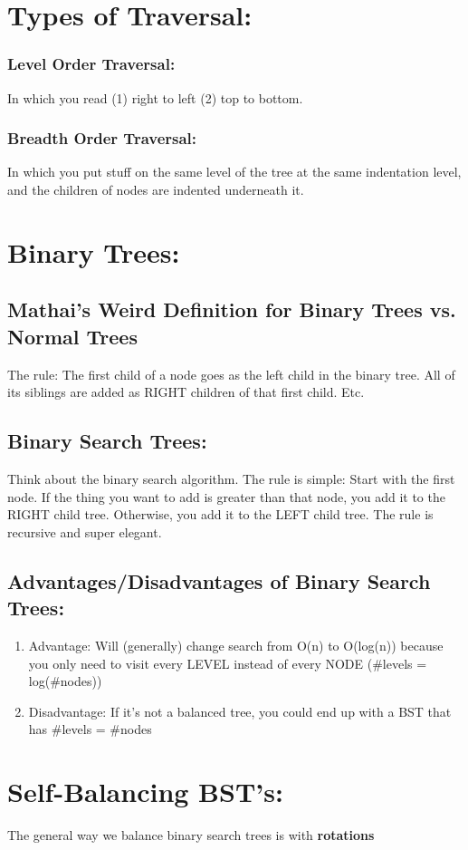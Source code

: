 \documentclass[a4paper,12pt]{report}
\begin{document}
\section{Types of Traversal:}
\subsubsection{Level Order Traversal: }
In which you read (1) right to left (2) top to bottom.
\subsubsection{Breadth Order Traversal: }
In which you put stuff on the same level of the tree at the same indentation level, and the children of nodes are indented underneath it.

\section{Binary Trees: }
\subsection{Mathai's Weird Definition for Binary Trees vs. Normal Trees}
The rule: The first child of a node goes as the left child in the binary tree. All of its siblings are added as RIGHT children of that first child. Etc.
\subsection{Binary Search Trees: }
Think about the binary search algorithm. The rule is simple: Start with the first node. If the thing you want to add is greater than that node, you add it to the RIGHT child tree. Otherwise, you add it to the LEFT child tree. The rule is recursive and super elegant.
\subsection{Advantages/Disadvantages of Binary Search Trees: }
\begin{enumerate}
\item Advantage: Will (generally) change search from O(n) to O(log(n)) because you only need to visit every LEVEL instead of every NODE (\#levels = log(\#nodes))
\item Disadvantage: If it's not a balanced tree, you could end up with a BST that has \#levels = \#nodes
\end{enumerate}

\section{Self-Balancing BST's: }
The general way we balance binary search trees is with \textbf{rotations}
\end{document}
